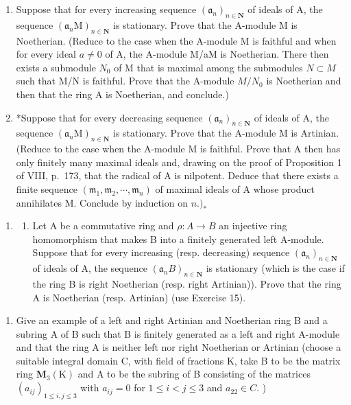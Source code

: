 \begin{enumerate}
\def\labelenumi{\alph{enumi})}
\item
  Suppose that for every increasing sequence \((\mathfrak{a}_{n})_{n\in\mathbf{N}}\) of ideals of A, the sequence \((\mathfrak{a}_{n}\mathrm{M})_{n\in\mathbf{N}}\) is stationary. Prove that the A-module M is Noetherian. (Reduce to the case when the A-module M is faithful and when for every ideal \(a\neq0\) of A, the A-module M/aM is Noetherian. There then exists a submodule \(N_{0}\) of M that is maximal among the submodules \(N\subset M\) such that M/N is faithful. Prove that the A-module \(M/N_{0}\) is Noetherian and then that the ring A is Noetherian, and conclude.)
\item
  *Suppose that for every decreasing sequence \((\mathfrak{a}_n)_{n \in \mathbf{N}}\) of ideals of A, the sequence \((\mathfrak{a}_n\mathrm{M})_{n \in \mathbf{N}}\) is stationary. Prove that the A-module M is Artinian. (Reduce to the case when the A-module M is faithful. Prove that A then has only finitely many maximal ideals and, drawing on the proof of Proposition 1 of VIII, p.~173, that the radical of A is nilpotent. Deduce that there exists a finite sequence \((\mathfrak{m}_{1}, \mathfrak{m}_{2}, \cdots, \mathfrak{m}_{n})\) of maximal ideals of A whose product annihilates M. Conclude by induction on \(n.)_{*}\)
\end{enumerate}

\begin{enumerate}
\def\labelenumi{\arabic{enumi})}
\setcounter{enumi}{15}
\tightlist
\item
  \begin{enumerate}
  \def\labelenumii{\alph{enumii})}
  \tightlist
  \item
    Let A be a commutative ring and \(\rho: A \to B\) an injective ring homomorphism that makes B into a finitely generated left A-module. Suppose that for every increasing (resp. decreasing) sequence \((\mathfrak{a}_{n})_{n \in \mathbf{N}}\) of ideals of A, the sequence \((\mathfrak{a}_{n}B)_{n \in \mathbf{N}}\) is stationary (which is the case if the ring B is right Noetherian (resp. right Artinian)). Prove that the ring A is Noetherian (resp. Artinian) (use Exercise 15).
  \end{enumerate}
\end{enumerate}

\begin{enumerate}
\def\labelenumi{\alph{enumi})}
\setcounter{enumi}{1}
\tightlist
\item
  Give an example of a left and right Artinian and Noetherian ring B and a subring A of B such that B is finitely generated as a left and right A-module and that the ring A is neither left nor right Noetherian or Artinian (choose a suitable integral domain C, with field of fractions K, take B to be the matrix ring \(\mathbf{M}_{3}(\mathrm{K})\) and A to be the subring of B consisting of the matrices \((a_{ij})_{1\leqslant i,j\leqslant3}\) with \(a_{ij}=0\) for \(1\leqslant i<j\leqslant3\) and \(a_{22}\in C.\) )
\end{enumerate}

